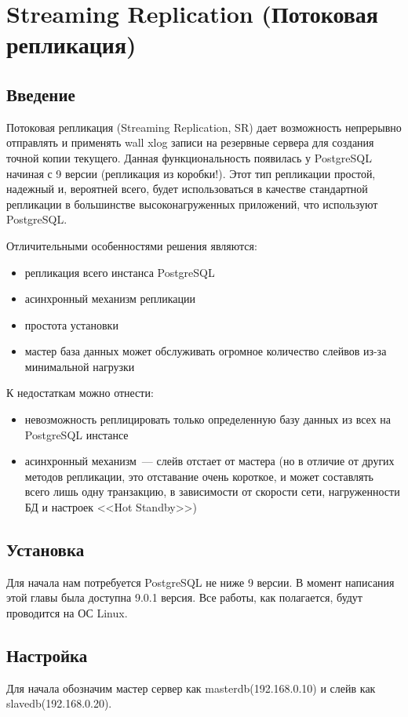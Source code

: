 \section{Streaming Replication (Потоковая репликация)}
\subsection{Введение}
Потоковая репликация (Streaming Replication, SR) дает возможность непрерывно отправлять и применять 
wall xlog записи на резервные сервера для создания точной копии текущего. Данная функциональность 
появилась у PostgreSQL начиная с 9 версии (репликация из коробки!). Этот тип репликации простой, надежный и, вероятней всего,  
будет использоваться в качестве стандартной репликации в большинстве высоконагруженных приложений, что используют PostgreSQL. 

Отличительными особенностями решения являются:
\begin{itemize}
\item репликация всего инстанса PostgreSQL
\item асинхронный механизм репликации
\item простота установки
\item мастер база данных может обслуживать огромное количество слейвов из-за минимальной нагрузки
\end{itemize}

К недостаткам можно отнести:
\begin{itemize}
\item невозможность реплицировать только определенную базу данных из всех на PostgreSQL инстансе
\item асинхронный механизм~--- слейв отстает от мастера (но в отличие от других методов репликации, 
это отставание очень короткое, и может составлять всего лишь одну транзакцию, в зависимости от скорости сети, 
нагруженности БД и настроек <<Hot Standby>>)
\end{itemize}

\subsection{Установка}
Для начала нам потребуется PostgreSQL не ниже 9 версии. В момент написания этой главы была доступна 9.0.1 версия. 
Все работы, как полагается, будут проводится на ОС Linux. 

\subsection{Настройка}
Для начала обозначим мастер сервер как masterdb(192.168.0.10) и слейв как slavedb(192.168.0.20).

